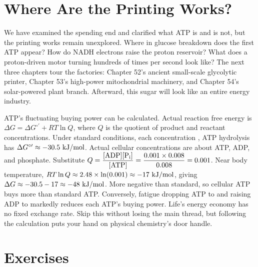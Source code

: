 \section{Where Are the Printing Works?}

We have examined the spending end and clarified what ATP is and is not, but the printing works remain unexplored. Where in glucose breakdown does the first ATP appear? How do NADH electrons raise the proton reservoir? What does a proton-driven motor turning hundreds of times per second look like? The next three chapters tour the factories: Chapter 52's ancient small-scale glycolytic printer, Chapter 53's high-power mitochondrial machinery, and Chapter 54's solar-powered plant branch. Afterward, this sugar will look like an entire energy industry.

\begin{tiaozhan}
ATP's fluctuating buying power can be calculated. Actual reaction free energy is $\Delta G = \Delta G^{\circ\prime} + RT\ln Q$, where $Q$ is the quotient of product and reactant concentrations. Under standard conditions, each concentration , ATP hydrolysis has $\Delta G^{\circ\prime} \approx -30.5\ \mathrm{kJ/mol}$. Actual cellular concentrations are about  ATP,  ADP, and  phosphate. Substitute $Q = \dfrac{[\mathrm{ADP}][\mathrm{P_i}]}{[\mathrm{ATP}]} = \dfrac{0.001 \times 0.008}{0.008} = 0.001$. Near body temperature, $RT\ln Q \approx 2.48 \times \ln(0.001) \approx -17\ \mathrm{kJ/mol}$, giving $\Delta G \approx -30.5 - 17 \approx -48\ \mathrm{kJ/mol}$. More negative than standard, so cellular ATP buys more than standard ATP. Conversely, fatigue dropping ATP to  and raising ADP to  markedly reduces each ATP's buying power. Life's energy economy has no fixed exchange rate. Skip this without losing the main thread, but following the calculation puts your hand on physical chemistry's door handle.
\end{tiaozhan}

\section*{Exercises}


